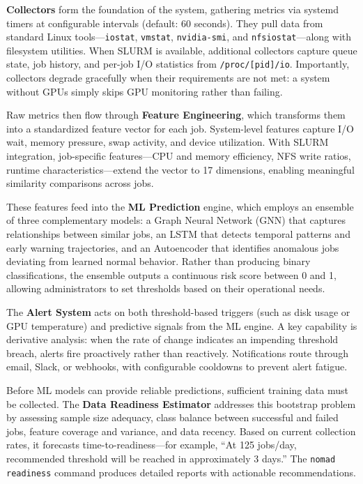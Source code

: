 \documentclass[11pt,a4paper]{article}
\begin{document}
\textbf{Collectors} form the foundation of the system, gathering metrics via systemd timers at configurable intervals (default: 60 seconds). They pull data from standard Linux tools---\texttt{iostat}, \texttt{vmstat}, \texttt{nvidia-smi}, and \texttt{nfsiostat}---along with filesystem utilities. When SLURM is available, additional collectors capture queue state, job history, and per-job I/O statistics from \texttt{/proc/[pid]/io}. Importantly, collectors degrade gracefully when their requirements are not met: a system without GPUs simply skips GPU monitoring rather than failing.

Raw metrics then flow through \textbf{Feature Engineering}, which transforms them into a standardized feature vector for each job. System-level features capture I/O wait, memory pressure, swap activity, and device utilization. With SLURM integration, job-specific features---CPU and memory efficiency, NFS write ratios, runtime characteristics---extend the vector to 17 dimensions, enabling meaningful similarity comparisons across jobs.

These features feed into the \textbf{ML Prediction} engine, which employs an ensemble of three complementary models: a Graph Neural Network (GNN) that captures relationships between similar jobs, an LSTM that detects temporal patterns and early warning trajectories, and an Autoencoder that identifies anomalous jobs deviating from learned normal behavior. Rather than producing binary classifications, the ensemble outputs a continuous risk score between 0 and 1, allowing administrators to set thresholds based on their operational needs.

The \textbf{Alert System} acts on both threshold-based triggers (such as disk usage or GPU temperature) and predictive signals from the ML engine. A key capability is derivative analysis: when the rate of change indicates an impending threshold breach, alerts fire proactively rather than reactively. Notifications route through email, Slack, or webhooks, with configurable cooldowns to prevent alert fatigue.

Before ML models can provide reliable predictions, sufficient training data must be collected. The \textbf{Data Readiness Estimator} addresses this bootstrap problem by assessing sample size adequacy, class balance between successful and failed jobs, feature coverage and variance, and data recency. Based on current collection rates, it forecasts time-to-readiness---for example, ``At 125 jobs/day, recommended threshold will be reached in approximately 3 days.'' The \texttt{nomad readiness} command produces detailed reports with actionable recommendations.
\end{document}
